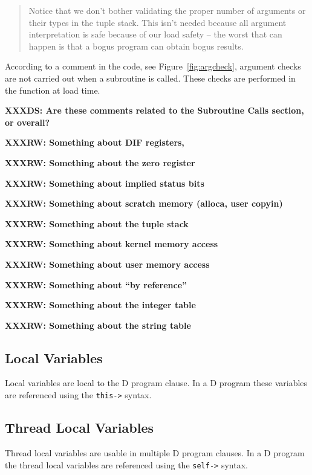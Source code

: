 \begin{quote}
  Notice that we don't bother validating the proper number of
  arguments or their types in the tuple stack.  This isn't needed
  because all argument interpretation is safe because of our load
  safety -- the worst that can happen is that a bogus program can
  obtain bogus results.
\label{fig:argcheck}
\end{quote}

According to a comment in the code, see Figure~\ref{fig:argcheck}, argument
checks are not carried out when a subroutine is called. These checks are
performed in the  function at load time.

\textbf{XXXDS: Are these comments related to the Subroutine Calls section, or
overall?}

\textbf{XXXRW: Something about DIF registers, \nregs{}}

\textbf{XXXRW: Something about the zero register}

\textbf{XXXRW: Something about implied status bits}

\textbf{XXXRW: Something about scratch memory (alloca, user copyin)}

\textbf{XXXRW: Something about the tuple stack}

\textbf{XXXRW: Something about kernel memory access}

\textbf{XXXRW: Something about user memory access}

\textbf{XXXRW: Something about ``by reference''}

\textbf{XXXRW: Something about the integer table}

\textbf{XXXRW: Something about the string table}

\subsection{Local Variables}
\label{sec:local-vars}

Local variables are local to the D program clause.  In a D program
these variables are referenced using the \verb|this->| syntax.  

\subsection{Thread Local Variables}
\label{sec:thread-local-vars}

Thread local variables are usable in multiple D program clauses.  In a
D program the thread local variables are referenced using the
\verb|self->| syntax.

